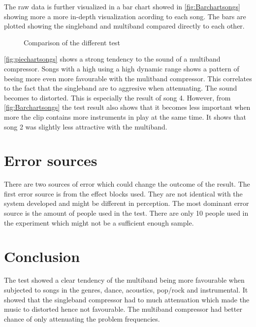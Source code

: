 The raw data is further visualized in a bar chart showed in \autoref{fig:Barchartsongs} showing more a more in-depth visualization acording to each song. The bars are plotted showing the singleband and multiband compared directly to each other.
\begin{figure}[H]
\centering
{}
\caption{Comparison of the different test}
\label{fig:Barchartsongs}
\end{figure}

\autoref{fig:piechartsongs} shows a strong tendency to the sound of a multiband compressor. Songs with a high using a high dynamic range shows a pattern of beeing more even more favourable with the mulitband compressor. This correlates to the fact that the singleband are to aggresive when attenuating. The sound becomes to distorted. This is especially the result of song 4. However, from \autoref{fig:Barchartsongs} the test result also shows that it becomes less important when more the clip contains more instruments in play at the same time. It shows that song 2 was slightly less attractive with the multiband. 


\section{Error sources}

There are two sources of error which could change the outcome of the result. The first error source is from the effect blocks used. They are not identical with the system developed and might be different in perception. The most dominant error source is the amount of people used in the test. There are only 10 people used in the experiment which might not be a sufficient enough sample.

\section{Conclusion}

The test showed a clear tendency of the multiband being more favourable when subjected to songs in the genres, dance, acoustics, pop/rock and instrumental. It showed that the singleband compressor had to much attenuation which made the music to distorted hence not favourable. The multiband compressor had better chance of only attenuating the problem frequencies.



